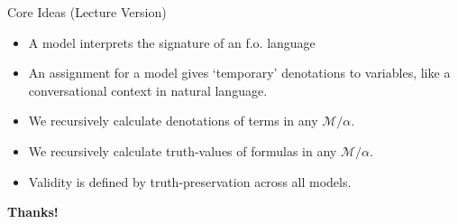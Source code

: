 \begin{frame}{Core Ideas (Lecture Version)}

	\begin{itemize}%
	\itemsep=16pt
	
	\item A model interprets the signature of an f.o. language
		
	\item An assignment for a model gives `temporary' denotations to variables, like a conversational context in natural language. 
	
	\item We recursively calculate denotations of terms in any $\mathcal{M}/\alpha$.
		
	\item We recursively calculate truth-values of formulas in any $\mathcal{M}/\alpha$.
		
	\item Validity is defined by truth-preservation across all models.
		
	\end{itemize}

\end{frame}


\begin{frame}

	\begin{center}
	{\huge\bf Thanks!}
	\end{center}

\end{frame}
